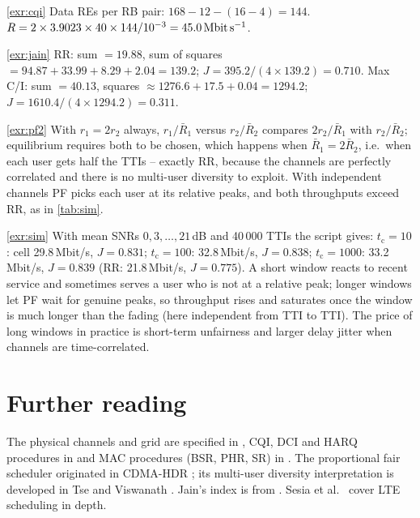 \documentclass[11pt,a4paper]{article}
\begin{document}
\begin{solutionbox}{\ref{exr:cqi}}
Data REs per RB pair: $168 - 12 - (16-4) = 144$. $R = 2\times3.9023\times40\times144/10^{-3} =
\qty{45.0}{\mega\bit\per\second}$.
\end{solutionbox}

\begin{solutionbox}{\ref{exr:jain}}
RR: sum $=19.88$, sum of squares $=94.87+33.99+8.29+2.04 = 139.2$; $J = 395.2/(4\times139.2) = 0.710$.
Max C/I: sum $= 40.13$, squares $\approx 1276.6+17.5+0.04 = 1294.2$; $J = 1610.4/(4\times1294.2) = 0.311$.
\end{solutionbox}

\begin{solutionbox}{\ref{exr:pf2}}
With $r_1 = 2r_2$ always, $r_1/\bar R_1$ versus $r_2/\bar R_2$ compares $2r_2/\bar R_1$ with $r_2/\bar R_2$;
equilibrium requires both to be chosen, which happens when $\bar R_1 = 2\bar R_2$, i.e.\ when each user
gets half the TTIs -- exactly RR, because the channels are perfectly correlated and there is no
multi-user diversity to exploit. With independent channels PF picks each user at its relative peaks,
and both throughputs exceed RR, as in \cref{tab:sim}.
\end{solutionbox}

\begin{solutionbox}{\ref{exr:sim}}
With mean SNRs $0,3,\dots,21$\,dB and 40\,000 TTIs the script gives: $t_\mathrm{c}=10$: cell 29.8\,Mbit/s,
$J=0.831$; $t_\mathrm{c}=100$: 32.8\,Mbit/s, $J = 0.838$; $t_\mathrm{c}=1000$: 33.2\,Mbit/s, $J=0.839$ (RR:
21.8\,Mbit/s, $J=0.775$). A short window reacts to recent service and sometimes serves a user who is not
at a relative peak; longer windows let PF wait for genuine peaks, so throughput rises and saturates once
the window is much longer than the fading (here independent from TTI to TTI). The price of long windows
in practice is short-term unfairness and larger delay jitter when channels are time-correlated.
\end{solutionbox}

\section{Further reading}
The physical channels and grid are specified in \cite{ts36211}, CQI, DCI and HARQ procedures in
\cite{ts36213} and MAC procedures (BSR, PHR, SR) in \cite{ts36321}. The proportional fair scheduler
originated in CDMA-HDR \cite{jalali2000hdr}; its multi-user diversity interpretation is developed in
Tse and Viswanath \cite{tse2005fundamentals}. Jain's index is from \cite{jain1984fairness}.
Sesia et al.\ \cite{sesia2011lte} cover LTE scheduling in depth.

\printbibliography[heading=subbibliography,title={\ACNstrRefs}]
\end{document}
